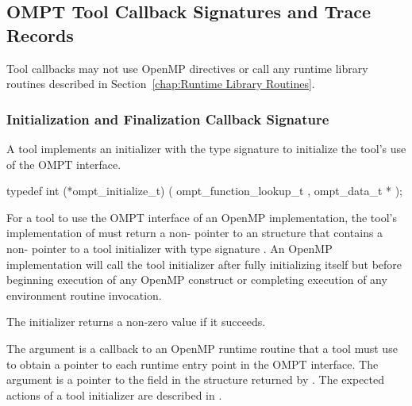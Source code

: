 \subsection{OMPT Tool Callback Signatures and Trace Records}
\label{sec:ompt-tool-callbacks}

\restrictions
Tool callbacks may not use OpenMP directives or call any runtime library routines
described in Section~\ref{chap:Runtime Library Routines}.

\subsubsection{Initialization and Finalization Callback Signature}

\label{sec:ompt_initialize_t}

\summary
A tool implements an initializer with the type signature
 to initialize the tool's use of
the OMPT interface.

\format

\begin{ccppspecific}
\begin{omptInquiry}
typedef int (*ompt_initialize_t) (
  ompt_function_lookup_t ,
  ompt_data_t *
);
\end{omptInquiry}
\end{ccppspecific}


\descr
For a tool to use the OMPT interface of an OpenMP implementation,
the tool's implementation of  must return a
non- pointer to an
 structure that contains a
non- pointer to a tool initializer with
type signature .
An OpenMP implementation will call the tool initializer
after fully initializing itself but before
beginning execution of any OpenMP construct
or completing execution of any environment routine invocation.

The initializer returns a non-zero value if it succeeds.

\argdesc
The argument  is a callback
to an OpenMP runtime routine that a tool must use to
obtain a pointer to each runtime entry point in the OMPT interface.
The argument  is a pointer to the
 field in the 
structure returned by .
The expected actions of a tool initializer are described in
.

